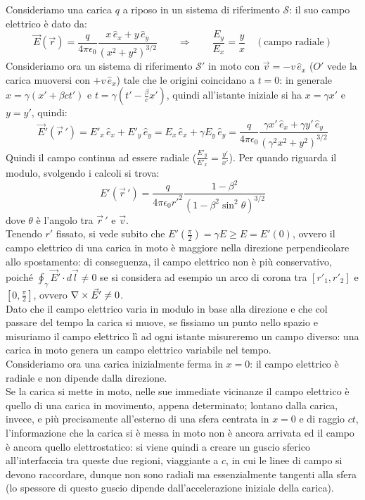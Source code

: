 Consideriamo una carica $ q $ a riposo in un sistema di riferimento $	\mathcal{S} $: il suo campo elettrico è dato da:
\begin{equation}
	\vec{E}(\vec{r}) = \frac{q}{4\pi\epsilon_0} \frac{x\,\hat{e}_x + y\,\hat{e}_y}{(x^2+y^2)^{3/2}} \qquad\Longrightarrow\qquad \frac{E_y}{E_x} = \frac{y}{x} \quad (\text{campo radiale})
	\label{eq:30}
\end{equation} 
Consideriamo ora un sistema di riferimento $ \mathcal{S}' $ in moto con $ \vec{v} = -v\,\hat{e}_x $ ($ O' $ vede la carica muoversi con $ +v\,\hat{e}_x $) tale che le origini coincidano a $ t = 0 $: in generale $ x = \gamma (x' + \beta ct') $ e $ t = \gamma (t' - \frac{\beta}{c} x') $, quindi all'istante iniziale si ha $ x = \gamma x' $ e $ y = y' $, quindi:
\begin{equation}
	\vec{E}'(\vec{r}\,') = E'_x\,\hat{e}_x + E'_y\,\hat{e}_y = E_x\,\hat{e}_x + \gamma E_y\,\hat{e}_y = \frac{q}{4\pi\epsilon_0} \frac{\gamma x' \,\hat{e}_x + \gamma y' \,\hat{e}_y}{(\gamma^2x^2+y^2)^{3/2}}
	\label{eq:31}
\end{equation}
Quindi il campo continua ad essere radiale ($ \frac{E'_y}{E'_x} = \frac{y'}{x'} $). Per quando riguarda il modulo, svolgendo i calcoli si trova:
\begin{equation}
	E'(\vec{r}\,') = \frac{q}{4\pi\epsilon_0 r'^2} \frac{1-\beta^2}{(1 - \beta^2\sin^2\theta)^{3/2}}
	\label{eq:32}
\end{equation}
dove $ \theta $ è l'angolo tra $ \vec{r}\,' $ e $ \vec{v} $. \\ 
%
Tenendo $ r' $ fissato, si vede subito che $ E'(\frac{\pi}{2}) = \gamma E \ge E = E'(0) $, ovvero il campo elettrico di una carica in moto è maggiore nella direzione perpendicolare allo spostamento: di conseguenza, il campo elettrico non è più conservativo, poiché $ \oint_{\gamma}\vec{E}'\cdot d\vec{l} \neq 0 $ se si considera ad esempio un arco di corona tra $ [r'_1,r'_2] $ e $ [0,\frac{\pi}{2}] $, ovvero $ \nabla\times\vec{E}' \neq 0 $. \\ 
%
Dato che il campo elettrico varia in modulo in base alla direzione e che col passare del tempo la carica si muove, se fissiamo un punto nello spazio e misuriamo il campo elettrico lì ad ogni istante misureremo un campo diverso: una carica in moto genera un campo elettrico variabile nel tempo. \\ 
%
Consideriamo ora una carica inizialmente ferma in $ x = 0 $: il campo elettrico è radiale e non dipende dalla direzione. \\Se la carica si mette in moto, nelle sue immediate vicinanze il campo elettrico è quello di una carica in movimento, appena determinato; lontano dalla carica, invece, e più precisamente all'esterno di una sfera centrata in $ x = 0 $ e di raggio $ ct $, l'informazione che la carica si è messa in moto non è ancora arrivata ed il campo è ancora quello elettrostatico: si viene quindi a creare un guscio sferico all'interfaccia tra queste due regioni, viaggiante a $ c $, in cui le linee di campo si devono raccordare, dunque non sono radiali ma essenzialmente tangenti alla sfera (lo spessore di questo guscio dipende dall'accelerazione iniziale della carica). \\ 
